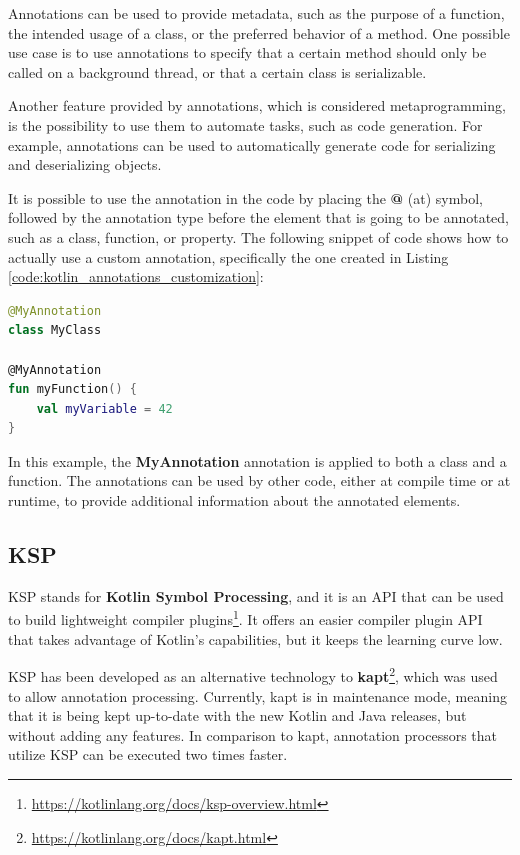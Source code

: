 Annotations can be used to provide metadata, such as the purpose of a function, the intended usage of a class, or the preferred behavior of a method. One possible use case is to use annotations to specify that a certain method should only be called on a background thread, or that a certain class is serializable.

Another feature provided by annotations, which is considered metaprogramming, is the possibility to use them to automate tasks, such as code generation. For example, annotations can be used to automatically generate code for serializing and deserializing objects.

It is possible to use the annotation in the code by placing the \textbf{@} (at) symbol, followed by the annotation type before the element that is going to be annotated, such as a class, function, or property.\newline
The following snippet of code shows how to actually use a custom annotation, specifically the one created in Listing \ref{code:kotlin_annotations_customization}:
\begin{lstlisting}[caption={Example of usage of a custom annotation in Kotlin}, language=Kotlin, captionpos=b, label={code:kotlin_annotations_usage}]
@MyAnnotation
class MyClass

@MyAnnotation
fun myFunction() {
    val myVariable = 42
}
\end{lstlisting}
In this example, the \textbf{MyAnnotation} annotation is applied to both a class and a function. The annotations can be used by other code, either at compile time or at runtime, to provide additional information about the annotated elements.

\subsection{KSP}\label{section:ksp}
KSP stands for \textbf{Kotlin Symbol Processing}, and it is an API that can be used to build lightweight compiler plugins\footnote{\url{https://kotlinlang.org/docs/ksp-overview.html}\label{ksp_footnote}}. It offers an easier compiler plugin API that takes advantage of Kotlin's capabilities, but it keeps the learning curve low.

KSP has been developed as an alternative technology to \textbf{kapt}\footnote{\url{https://kotlinlang.org/docs/kapt.html}}, which was used to allow annotation processing. Currently, kapt is in maintenance mode, meaning that it is being kept up-to-date with the new Kotlin and Java releases, but without adding any features.\newline
In comparison to kapt, annotation processors that utilize KSP can be executed two times faster.


